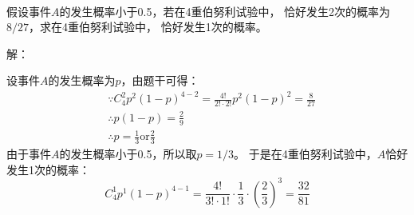 ~

\begin{example}
假设事件$A$的发生概率小于0.5，若在4重伯努利试验中， 恰好发生2次的概率为$8/27$，求在4重伯努利试验中， 恰好发生1次的概率。
\end{example}

解：

设事件$A$的发生概率为$p$，由题干可得：
\begin{align*}
&\because C_{4}^{2}p^2\left( 1-p \right) ^{4-2}=\frac{4!}{2!\cdot 2!}p^2\left( 1-p \right) ^2=\frac{8}{27} \\
&\therefore p\left( 1-p \right) =\frac{2}{9} \\
&\therefore p=\frac{1}{3}\mathrm{or} \frac{2}{3}
\end{align*}
由于事件$A$的发生概率小于0.5，所以取$p=1/3$。
于是在4重伯努利试验中，$A$恰好发生1次的概率：
\[
C_{4}^{1}p^1\left( 1-p \right) ^{4-1}=\frac{4!}{3!\cdot 1!}\cdot \frac{1}{3}\cdot \left( \frac{2}{3} \right) ^3=\frac{32}{81}
\]




